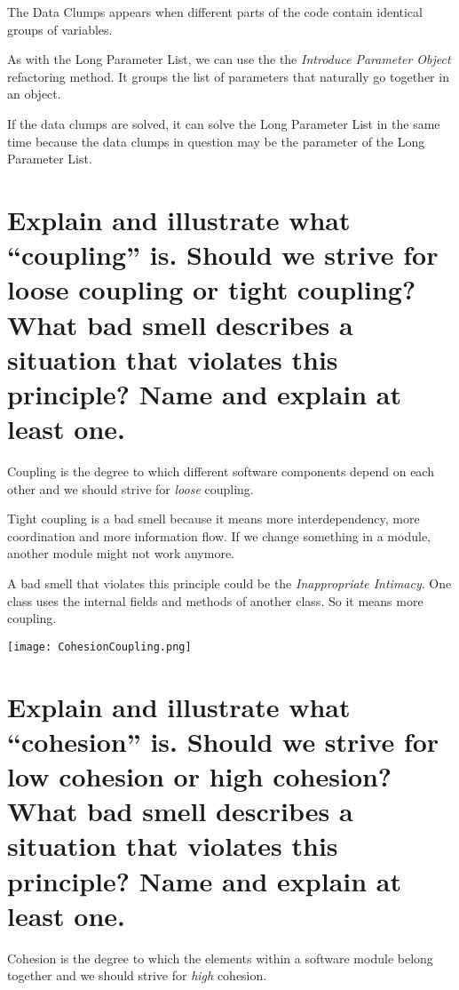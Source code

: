 The Data Clumps appears when different parts of the code contain identical groups of variables.\newline

As with the Long Parameter List, we can use the the \textit{Introduce Parameter Object} refactoring method. It groups the list of parameters  that naturally go together in an object.\newline

If the data clumps are solved, it can solve the Long Parameter List in the same time because the data clumps in question may be the parameter of the Long Parameter List.

\section{Explain and illustrate what “coupling” is. Should we strive for loose coupling or tight
coupling? What bad smell describes a situation that violates this principle? Name and
explain at least one.}

Coupling is the degree to which different software components depend on each other and we should strive for \emph{loose} coupling.\newline

Tight coupling is a bad smell because it means more interdependency, more  coordination and more information flow. If we change something in a module, another module might not work anymore.\newline

A bad smell that violates this principle could be the \emph{Inappropriate Intimacy}. One class uses the internal fields and methods of another class. So it means more coupling.

\begin{center}
\texttt{[image: CohesionCoupling.png]}
\end{center}

\section{Explain and illustrate what “cohesion” is. Should we strive for low cohesion or high
cohesion? What bad smell describes a situation that violates this principle? Name and
explain at least one.}

Cohesion is the degree to which the elements within a software module belong together and we should strive for \emph{high} cohesion.\newline

